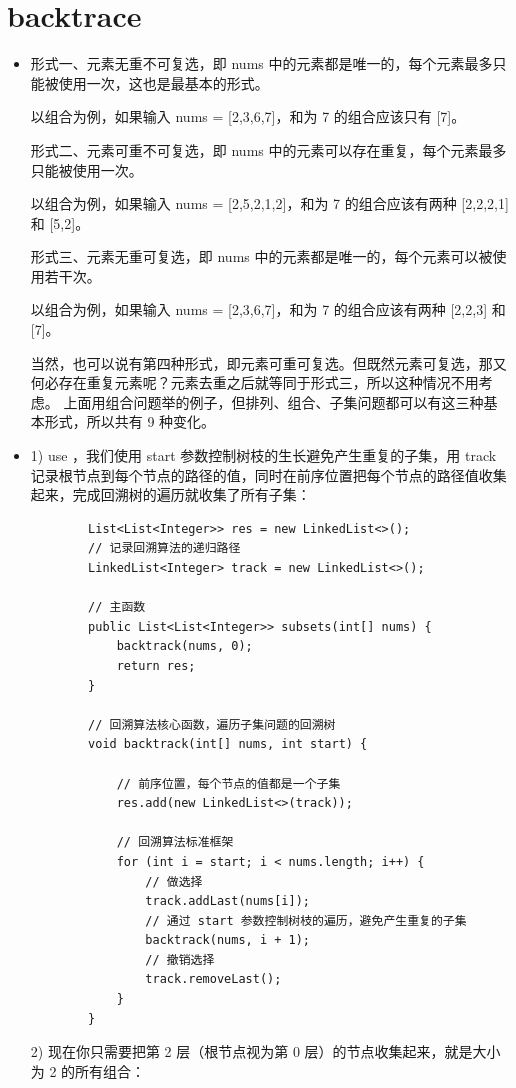 \documentclass[a4paper,11pt,twoside]{book}
\begin{document}
\section{backtrace}
\begin{itemize}
	\item 形式一、元素无重不可复选，即 nums 中的元素都是唯一的，每个元素最多只能被使用一次，这也是最基本的形式。
	
	以组合为例，如果输入 nums = [2,3,6,7]，和为 7 的组合应该只有 [7]。
	
	形式二、元素可重不可复选，即 nums 中的元素可以存在重复，每个元素最多只能被使用一次。
	
	以组合为例，如果输入 nums = [2,5,2,1,2]，和为 7 的组合应该有两种 [2,2,2,1] 和 [5,2]。
	
	形式三、元素无重可复选，即 nums 中的元素都是唯一的，每个元素可以被使用若干次。
	
	以组合为例，如果输入 nums = [2,3,6,7]，和为 7 的组合应该有两种 [2,2,3] 和 [7]。
	
	当然，也可以说有第四种形式，即元素可重可复选。但既然元素可复选，那又何必存在重复元素呢？元素去重之后就等同于形式三，所以这种情况不用考虑。
	上面用组合问题举的例子，但排列、组合、子集问题都可以有这三种基本形式，所以共有 9 种变化。
	
	\item 1) use ，我们使用 start 参数控制树枝的生长避免产生重复的子集，用 track 记录根节点到每个节点的路径的值，同时在前序位置把每个节点的路径值收集起来，完成回溯树的遍历就收集了所有子集：
	
	\begin{lstlisting}
		List<List<Integer>> res = new LinkedList<>();
		// 记录回溯算法的递归路径
		LinkedList<Integer> track = new LinkedList<>();
		
		// 主函数
		public List<List<Integer>> subsets(int[] nums) {
			backtrack(nums, 0);
			return res;
		}
		
		// 回溯算法核心函数，遍历子集问题的回溯树
		void backtrack(int[] nums, int start) {
			
			// 前序位置，每个节点的值都是一个子集
			res.add(new LinkedList<>(track));
			
			// 回溯算法标准框架
			for (int i = start; i < nums.length; i++) {
				// 做选择
				track.addLast(nums[i]);
				// 通过 start 参数控制树枝的遍历，避免产生重复的子集
				backtrack(nums, i + 1);
				// 撤销选择
				track.removeLast();
			}
		}
	\end{lstlisting}
	
	2) 现在你只需要把第 2 层（根节点视为第 0 层）的节点收集起来，就是大小为 2 的所有组合：
	

\end{itemize}
\end{document}
